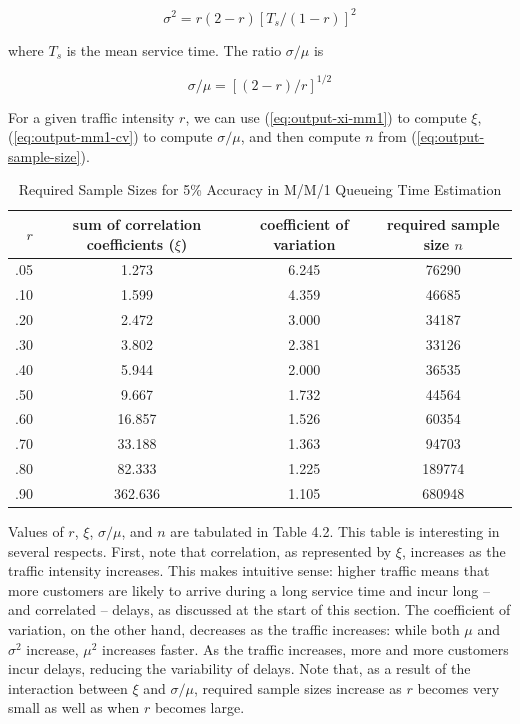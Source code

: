 \begin{equation}
\sigma^2 = r(2 - r)\left[T_s/(1 - r)\right]^2
\label{eq:output-mm1-variance}
\end{equation}

where $T_s$ is the mean service time. The ratio $\sigma/\mu$ is

\begin{equation}
\sigma/\mu = \left[(2 - r)/r\right]^{1/2}
\label{eq:output-mm1-cv}
\end{equation}

For a given traffic intensity $r$, we can use (\ref{eq:output-xi-mm1}) to
compute $\xi$, (\ref{eq:output-mm1-cv}) to compute $\sigma/\mu$, and then
compute $n$ from (\ref{eq:output-sample-size}).

\begin{table}[ht]
\centering
\begin{tabular}{rccc}
\toprule
$r$ & sum of correlation coefficients ($\xi$) & coefficient of variation & required sample size $n$ \\
\midrule
.05 & 1.273 & 6.245 &  76290 \\
.10 & 1.599 & 4.359 &  46685 \\
.20 & 2.472 & 3.000 &  34187 \\
.30 & 3.802 & 2.381 &  33126 \\
.40 & 5.944 & 2.000 &  36535 \\
.50 & 9.667 & 1.732 &  44564 \\
.60 & 16.857 & 1.526 & 60354 \\
.70 & 33.188 & 1.363 & 94703 \\
.80 & 82.333 & 1.225 & 189774 \\
.90 & 362.636 & 1.105 & 680948 \\
\bottomrule
\end{tabular}
\caption{Required Sample Sizes for 5\% Accuracy in M/M/1 Queueing Time Estimation}
\end{table}

Values of $r$, $\xi$, $\sigma/\mu$, and $n$ are tabulated in Table 4.2. This
table is interesting in several respects. First, note that correlation, as
represented by $\xi$, increases as the traffic intensity increases. This makes
intuitive sense: higher traffic means that more customers are likely to arrive
during a long service time and incur long -- and correlated -- delays, as
discussed at the start of this section. The coefficient of variation, on the
other hand, decreases as the traffic increases: while both $\mu$ and
$\sigma^2$ increase, $\mu^2$ increases faster. As the traffic increases, more
and more customers incur delays, reducing the variability of delays. Note
that, as a result of the interaction between $\xi$ and $\sigma/\mu$, required
sample sizes increase as $r$ becomes very small as well as when $r$ becomes
large.

